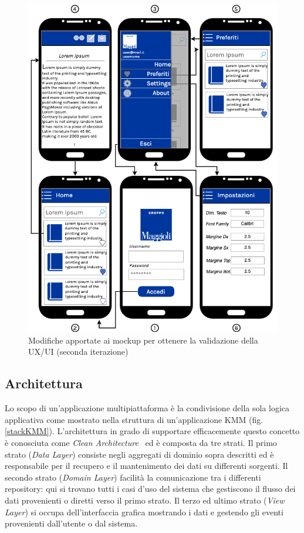 \begin{figure}[H]
    \centering
    \includegraphics[width=1\textwidth]{img/mockup-uiux-2.png}
    \caption{Modifiche apportate ai mockup per ottenere la validazione della UX/UI (seconda iterazione)}
\end{figure}

\subsection{Architettura}
Lo scopo di un'applicazione multipiattaforma è la condivisione della sola logica applicativa come mostrato nella struttura di un'applicazione KMM (fig. \ref{stackKMM}). 
L'architettura in grado di supportare efficacemente questo concetto è conosciuta come \textit{Clean Architecture}~\cite{martin2017architecture} ed è composta da tre strati. 
Il primo strato (\textit{Data Layer}) consiste negli aggregati di dominio sopra descritti ed è responsabile per il recupero e il mantenimento dei dati su differenti sorgenti. 
Il secondo strato (\textit{Domain Layer}) facilità la comunicazione tra i differenti repository:
qui si trovano tutti i casi d'uso del sistema che gestiscono il flusso dei dati provenienti o diretti verso il primo strato. 
Il terzo ed ultimo strato (\textit{View Layer}) si occupa dell'interfaccia grafica mostrando i dati e gestendo gli eventi provenienti dall'utente o dal sistema.

